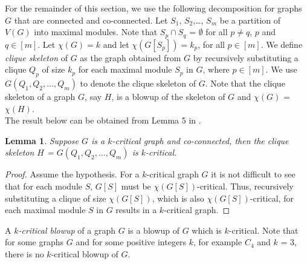 \documentclass[a4paper,11pt]{article}
\newtheorem{lemma}[theorem]{Lemma}
\theoremstyle{case}
\begin{document}
For the remainder of this section, we use the following decomposition for graphs $G$ that are connected and 
co-connected.  Let $S_1$, $S_2$,\dots, $S_m$ be a partition of $V(G)$ into maximal modules. Note that $S_p \cap S_q$ = $\emptyset$ for all $p\neq q$, $p$ and $q \in [m]$. Let $\chi(G) = k$ and let $\chi(G[S_p]) = k_p$, for all $p\in [m]$. We define \emph{clique skeleton} of $G$ as the graph obtained from $G$ by recursively substituting a clique $Q_p$ of size $k_p$ for each maximal module $S_p$ in $G$, where $p \in [m]$. We use $G(Q_1, Q_2,\dots,Q_m)$ to denote the clique skeleton of $G$. Note that the clique skeleton of a graph $G$, say $H$, is a blowup of the skeleton of $G$ and $\chi(G)$ = $\chi(H)$. \\

The result below can be obtained from Lemma 5 in \cite{YuJoo2026}.

\begin{lemma}\label{lem:clq-sklton}
    Suppose $G$ is a $k$-critical graph and co-connected, then the clique skeleton $H$ = $G(Q_1, Q_2,\dots,Q_m)$ is $k$-critical.
\end{lemma}
\begin{proof}
    Assume the hypothesis. For a $k$-critical graph $G$ it is not difficult to see that for each module $S$, $G[S]$ must be $\chi(G[S])$-critical. Thus, recursively substituting a clique of size $\chi(G[S])$, which is also $\chi(G[S])$-critical, for each maximal module $S$ in $G$ results in a $k$-critical graph.
\end{proof}

 A \emph{$k$-critical blowup} of a graph $G$ is a blowup of $G$ which is $k$-critical. Note that for some graphs $G$ and for some positive integers $k$, for example $C_4$ and $k$ = 3, there is no $k$-critical blowup of $G$.
\end{document}
